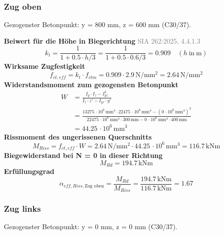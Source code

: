 \documentclass[11pt,a4paper]{article}
\newcommand{\normref}[1]{{\small\textcolor{gray}{#1}}}
\begin{document}
\subsubsection{Zug oben}
Gezogenster Betonpunkt: y = 800 mm, z = 600 mm (C30/37).

\noindent\textbf{Beiwert für die Höhe in Biegerichtung} \hfill \normref{SIA 262:2025, 4.4.1.3}
\begin{equation*}
k_t = \frac{1}{1 + 0.5 \cdot h/3} = \frac{1}{1 + 0.5 \cdot 0.6/3} = 0.909 \quad \left(h\ \text{in}\ \mathrm{m}\right)
\end{equation*}
\noindent\textbf{Wirksame Zugfestigkeit}
\begin{equation*}
f_{ct,eff} = k_t \cdot f_{ctm} = 0.909 \cdot 2.9\,\mathrm{N}/\mathrm{mm}^{2} = 2.64\,\mathrm{N}/\mathrm{mm}^{2}
\end{equation*}
\noindent\textbf{Widerstandsmoment zum gezogensten Betonpunkt}
\begin{equation*}
\begin{aligned}
  W &= \frac{I_y \cdot I_z - I_{yz}^{2}}{I_z \cdot z' - I_{yz} \cdot y'} \\
  &= \frac{13275\,\cdot 10^{6}\,\mathrm{mm}^{4} \cdot 22475\,\cdot 10^{6}\,\mathrm{mm}^{4} - \left(0\,\cdot 10^{6}\,\mathrm{mm}^{4}\right)^{2}}{22475\,\cdot 10^{6}\,\mathrm{mm}^{4} \cdot 300\,\mathrm{mm} - 0\,\cdot 10^{6}\,\mathrm{mm}^{4} \cdot 400\,\mathrm{mm}} \\
  &= 44.25\,\cdot 10^{6}\,\mathrm{mm}^{3}
\end{aligned}
\end{equation*}
\noindent\textbf{Rissmoment des ungerissenen Querschnitts}
\begin{equation*}
M_{Riss} = f_{ct,eff} \cdot W = 2.64\,\mathrm{N}/\mathrm{mm}^{2} \cdot 44.25\,\cdot 10^{6}\,\mathrm{mm}^{3} = 116.7\,\mathrm{kNm}
\end{equation*}
\noindent\textbf{Biegewiderstand bei N = 0 in dieser Richtung}
\begin{equation*}
M_{Rd} = 194.7\,\mathrm{kNm}
\end{equation*}
\noindent\textbf{Erfüllungsgrad}
\begin{equation*}
\alpha_{eff,Riss,\text{Zug oben}} = \frac{M_{Rd}}{M_{Riss}} = \frac{194.7\,\mathrm{kNm}}{116.7\,\mathrm{kNm}} = 1.67
\end{equation*}
\subsubsection{Zug links}
Gezogenster Betonpunkt: y = 0 mm, z = 0 mm (C30/37).
\end{document}

